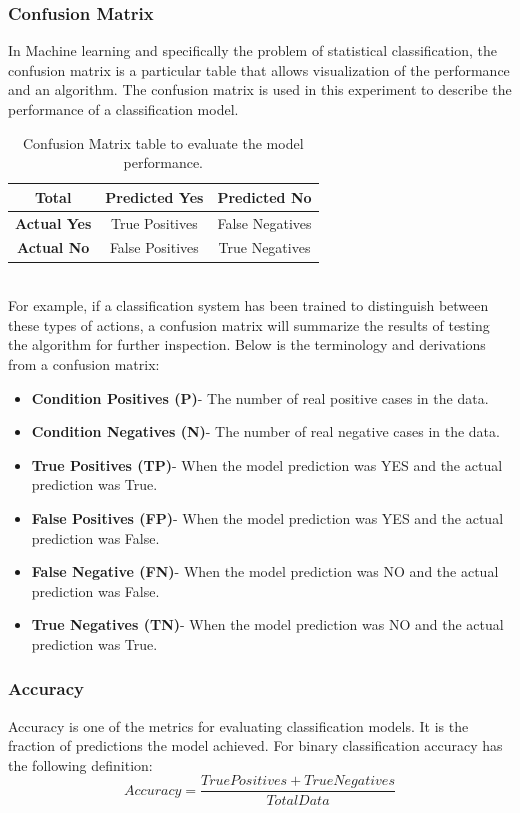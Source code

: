 \subsubsection{Confusion Matrix}
\hspace{5mm} In Machine learning and specifically the problem of statistical classification, the confusion matrix is a particular table that allows visualization of the performance and an algorithm. The confusion matrix is used in this experiment to describe the performance of a classification model.\\
\begin{table}[]
\centering
\begin{tabular}{|c|c|c|}
\hline
\textbf{Total}      & \textbf{Predicted Yes} & \textbf{Predicted No} \\ \hline
\textbf{Actual Yes} & True Positives         & False Negatives       \\ \hline
\textbf{Actual No}  & False Positives        & True Negatives        \\ \hline
\end{tabular}
\caption{Confusion Matrix table to evaluate the model performance.}
\label{my-label}
\end{table}\hfill \\

For example, if a classification system has been trained to distinguish between these types of actions, a confusion matrix will summarize the results of testing the algorithm for further inspection. Below is the terminology and derivations from a confusion matrix:
\begin{itemize}
    \item \textbf{Condition Positives (P)}- The number of real positive cases in the data.
    \item \textbf{Condition Negatives (N)}- The number of real negative cases in the data.
    \item \textbf{True Positives (TP)}- When the model prediction was YES and the actual prediction was True.
    \item \textbf{False Positives (FP)}- When the model prediction was YES and the actual prediction was False.
    \item \textbf{False Negative (FN)}- When the model prediction was NO and the actual prediction was False.
    \item \textbf{True Negatives (TN)}- When the model prediction was NO and the actual prediction was True.
\end{itemize}
\subsubsection{Accuracy}
\hspace{5mm} Accuracy is one of the metrics for evaluating classification models. It is the fraction of predictions the model achieved. For binary classification accuracy has the following definition:\\
\begin{equation}
Accuracy = \frac{True Positives+True Negatives}{Total Data}
\end{equation}


